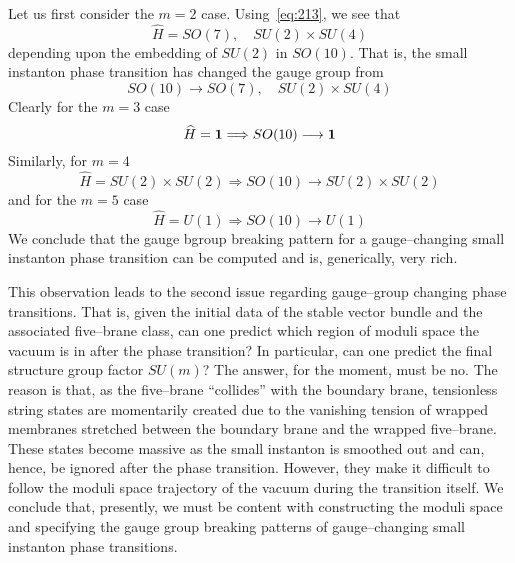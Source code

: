 \documentclass[a4paper,12pt]{article}
\numberwithin{equation}{section}
\theoremstyle{plain}
\begin{document}
Let us first consider the $m=2$ case. Using~\eqref{eq:213}, we see that
\begin{equation}
\widehat{H}= SO(7), \quad SU(2) \times SU(4)
\label{eq:215}
\end{equation}
depending upon the embedding of $SU(2)$ in $SO(10)$. That is, the small
instanton phase transition has changed the gauge group from 
\begin{equation}
SO(10) \longrightarrow  SO(7), \quad SU(2) \times SU(4)
\label{eq:216}
\end{equation}
Clearly for the $m=3$ case
\begin{equation}
\widehat{H}= {\bf 1 \rm} \Longrightarrow SO(10) \longrightarrow {\bf 1 \rm}
\label{eq:217}
\end{equation}
Similarly, for $m=4$
\begin{equation}
\widehat{H}= SU(2) \times SU(2) \Longrightarrow SO(10) \longrightarrow 
SU(2) \times SU(2)
\label{eq:218}
\end{equation}
and for the $m=5$ case
\begin{equation}
\widehat{H}= U(1) \Longrightarrow SO(10) \longrightarrow U(1)
\label{eq:219}
\end{equation}
We conclude that the gauge bgroup breaking pattern for a gauge--changing 
small instanton phase transition can be computed and is, generically, very
rich.

This observation leads to the second issue regarding gauge--group changing
phase transitions. That is, given the initial data of the stable vector bundle
and the associated five--brane class, can one predict which region of moduli
space the vacuum is in after the phase transition? In particular, can one predict
the final structure group factor $SU(m)$? The answer, for the moment, must be
no. The reason is that, as the five--brane ``collides'' with the boundary
brane, tensionless string states are momentarily created due to the vanishing
tension of wrapped membranes stretched between the boundary brane and the
wrapped five--brane. These states become massive as the small instanton is
smoothed out and can, hence, be ignored after the phase transition. However,
they make it difficult to follow the moduli space trajectory of the vacuum
during the transition itself. We conclude that, presently, we must be content
with constructing the moduli space and specifying the gauge group breaking
patterns of gauge--changing small instanton phase transitions.

\end{document}
